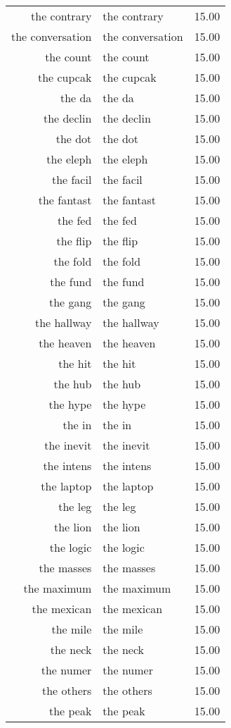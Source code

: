 \begin{table}[ht]
\begin{tabular}{rlr}
  the contrary & the contrary & 15.00 \\ 
  the conversation & the conversation & 15.00 \\ 
  the count & the count & 15.00 \\ 
  the cupcak & the cupcak & 15.00 \\ 
  the da & the da & 15.00 \\ 
  the declin & the declin & 15.00 \\ 
  the dot & the dot & 15.00 \\ 
  the eleph & the eleph & 15.00 \\ 
  the facil & the facil & 15.00 \\ 
  the fantast & the fantast & 15.00 \\ 
  the fed & the fed & 15.00 \\ 
  the flip & the flip & 15.00 \\ 
  the fold & the fold & 15.00 \\ 
  the fund & the fund & 15.00 \\ 
  the gang & the gang & 15.00 \\ 
  the hallway & the hallway & 15.00 \\ 
  the heaven & the heaven & 15.00 \\ 
  the hit & the hit & 15.00 \\ 
  the hub & the hub & 15.00 \\ 
  the hype & the hype & 15.00 \\ 
  the in & the in & 15.00 \\ 
  the inevit & the inevit & 15.00 \\ 
  the intens & the intens & 15.00 \\ 
  the laptop & the laptop & 15.00 \\ 
  the leg & the leg & 15.00 \\ 
  the lion & the lion & 15.00 \\ 
  the logic & the logic & 15.00 \\ 
  the masses & the masses & 15.00 \\ 
  the maximum & the maximum & 15.00 \\ 
  the mexican & the mexican & 15.00 \\ 
  the mile & the mile & 15.00 \\ 
  the neck & the neck & 15.00 \\ 
  the numer & the numer & 15.00 \\ 
  the others & the others & 15.00 \\ 
  the peak & the peak & 15.00 \\ 

\end{tabular}
\end{table}

